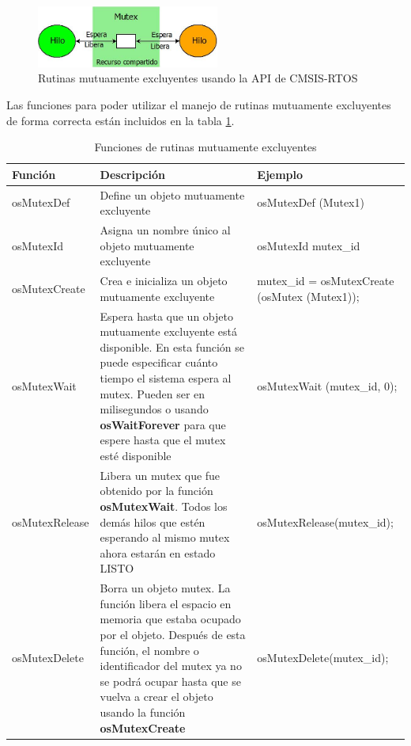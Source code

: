 \documentclass[12pt, twoside]{report}
\begin{document}
\begin{figure}[H]
	\centering
	\includegraphics[width=60mm]{mutex}
	\caption{Rutinas mutuamente excluyentes usando la API de CMSIS-RTOS}
	\label{cap2:005}
\end{figure}

Las funciones para poder utilizar el manejo de rutinas mutuamente excluyentes de forma correcta están incluidos en la  tabla \ref{tabla2:003}.

\begin{table}[H]
	\begin{tabularx}{15cm}{|X|X|X|}
		\hline
		\rowcolor[gray]{0.8}Función & Descripción & Ejemplo\\
		\hline
		\rowcolor[gray]{1}osMutexDef  & Define un objeto mutuamente excluyente & osMutexDef (Mutex1)\\
		\hline
		\rowcolor[gray]{0.8}osMutexId & Asigna un nombre único al objeto mutuamente excluyente & osMutexId mutex\_id \\
		\hline
		\rowcolor[gray]{1}osMutexCreate & Crea e inicializa un objeto mutuamente excluyente & mutex\_id = osMutexCreate  (osMutex (Mutex1)); \\
		\hline
		\rowcolor[gray]{0.8}osMutexWait & Espera hasta que un objeto mutuamente excluyente está disponible. En esta función se puede especificar cuánto tiempo el sistema espera al mutex. Pueden ser en milisegundos o usando \textbf{osWaitForever} para que espere hasta que el mutex esté disponible &   osMutexWait    (mutex\_id, 0);\\
		\hline
		\rowcolor[gray]{1}osMutexRelease &  Libera un mutex que fue obtenido por la función \textbf{osMutexWait}. Todos los demás hilos que estén esperando al mismo mutex ahora estarán en estado LISTO  & osMutexRelease(mutex\_id); \\
		\hline
		\rowcolor[gray]{0.8}osMutexDelete & Borra un objeto mutex. La función libera el espacio en memoria que estaba ocupado por el objeto. Después de esta función, el nombre o identificador del mutex ya no se podrá ocupar hasta que se vuelva a crear el objeto usando la función \textbf{osMutexCreate} &  osMutexDelete(mutex\_id);\\
		\hline
	\end{tabularx}
	\caption{Funciones de rutinas mutuamente excluyentes}
	\label{tabla2:003}
\end{table}
\end{document}
